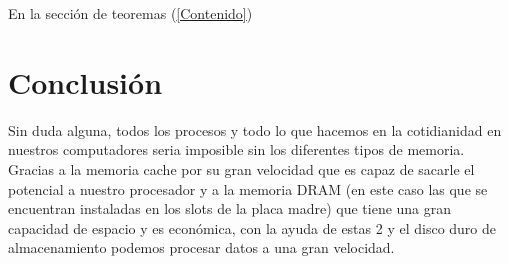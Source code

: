 \documentclass{article}
\begin{document}
En la sección de teoremas (\ref{Contenido})

\section{Conclusión} \label{Conclusión}
Sin duda alguna, todos los procesos y todo lo que hacemos en la cotidianidad en nuestros computadores seria imposible sin los diferentes tipos de memoria. Gracias a la memoria cache por su gran velocidad que es capaz de sacarle el potencial a nuestro procesador y a la memoria DRAM (en este caso las que se encuentran instaladas en los slots de la placa madre) que tiene una gran capacidad de espacio y es económica, con la ayuda de estas 2 y el disco duro de almacenamiento podemos procesar datos a una gran velocidad.



\end{document}
